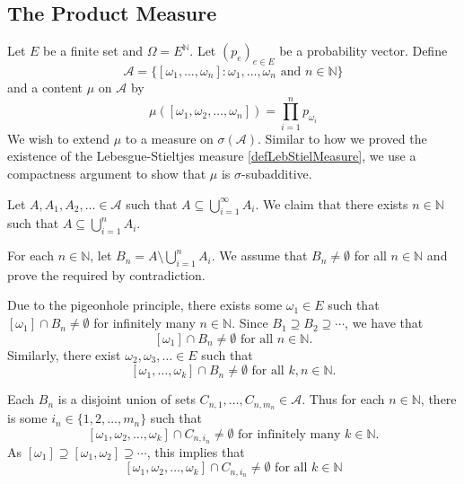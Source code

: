 \begin{enumerate}
    
    
\end{enumerate}

\subsection{The Product Measure}

Let $E$ be a finite set and $\Omega=E^\mathbb{N}$. Let $(p_e)_{e\in E}$ be a probability vector. Define
$$\mathcal{A}=\{[\omega_1,\ldots,\omega_n]:\omega_1,\ldots,\omega_n\text{ and }n\in\mathbb{N}\}$$
and a content $\mu$ on $\mathcal{A}$ by
$$\mu([\omega_1,\omega_2,\ldots,\omega_n])=\prod_{i=1}^n p_{\omega_i}$$
We wish to extend $\mu$ to a measure on $\sigma(\mathcal{A})$. Similar to how we proved the existence of the Lebesgue-Stieltjes measure \ref{defLebStielMeasure}, we use a compactness argument to show that $\mu$ is $\sigma$-subadditive.

Let $A,A_1,A_2,\ldots\in\mathcal{A}$ such that $A\subseteq\bigcup_{i=1}^\infty A_i$. We claim that there exists $n\in\mathbb{N}$ such that $A\subseteq\bigcup_{i=1}^n A_i.$

For each $n\in\mathbb{N}$, let $B_n=A\setminus\bigcup_{i=1}^n A_i$. We assume that $B_n\neq\emptyset$ for all $n\in\mathbb{N}$ and prove the required by contradiction.

Due to the pigeonhole principle, there exists some $\omega_1\in E$ such that $[\omega_1]\cap B_n\neq\emptyset$ for infinitely many $n\in\mathbb{N}$. Since $B_1\supseteq B_2\supseteq\cdots$, we have that
$$[\omega_1]\cap B_n\neq\emptyset\text{ for all }n\in\mathbb{N}.$$
Similarly, there exist $\omega_2,\omega_3,\ldots\in E$ such that
$$[\omega_1,\ldots,\omega_k]\cap B_n\neq\emptyset\text{ for all }k,n\in\mathbb{N}.$$

Each $B_n$ is a disjoint union of sets $C_{n,1},\ldots,C_{n,m_n}\in\mathcal{A}$. Thus for each $n\in\mathbb{N}$, there is some $i_n\in\{1,2,\ldots,m_n\}$ such that
$$[\omega_1,\omega_2,\ldots,\omega_k]\cap C_{n,i_n}\neq\emptyset\text{ for infinitely many }k\in\mathbb{N}.$$
As $[\omega_1]\supseteq[\omega_1,\omega_2]\supseteq\cdots$, this implies that
$$[\omega_1,\omega_2,\ldots,\omega_k]\cap C_{n,i_n}\neq\emptyset\text{ for all } k\in\mathbb{N}$$

